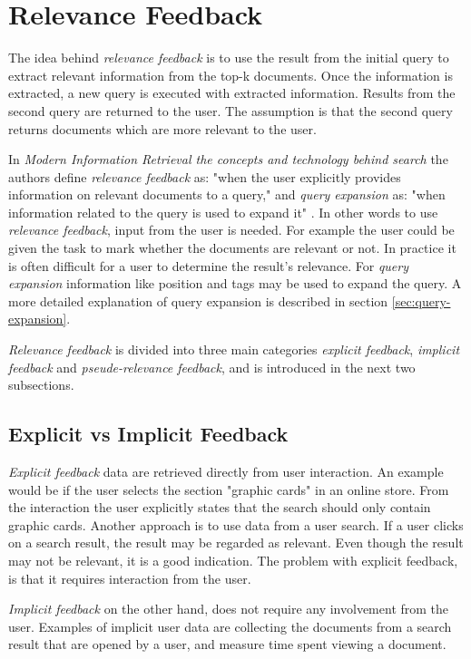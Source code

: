 \section{Relevance Feedback}
The idea behind \textit{relevance feedback} is to use the result from the initial query to extract relevant information from the top-k documents.
Once the information is extracted, a new query is executed with extracted information.
Results from the second query are returned to the user.
The assumption is that the second query returns documents which are more relevant to the user.

In \textit{Modern Information Retrieval the concepts and technology behind search} \cite{ir-book} the authors define \textit{relevance feedback} as: "when the user explicitly provides information on relevant documents to a query,"
and \textit{query expansion} as: "when information related to the query is used to expand it" \cite[p. 177]{ir-book}.
In other words to use \textit{relevance feedback}, input from the user is needed.
For example the user could be given the task to mark whether the documents are relevant or not.
In practice it is often difficult for a user to determine the result's relevance.
For \textit{query expansion} information like position and tags may be used to expand the query.
A more detailed explanation of query expansion is described in section \ref{sec:query-expansion}.

\textit{Relevance feedback} is divided into three main categories \textit{explicit feedback}, \textit{implicit feedback} and \textit{pseude-relevance feedback},
and is introduced in the next two subsections.

\subsection{Explicit vs Implicit Feedback}
\textit{Explicit feedback} data are retrieved directly from user interaction.
An example would be if the user selects the section "graphic cards" in an online store.
From the interaction the user explicitly states that the search should only contain graphic cards.
Another approach is to use data from a user search.
If a user clicks on a search result, the result may be regarded as relevant.
Even though the result may not be relevant, it is a good indication.
The problem with explicit feedback, is that it requires interaction from the user.

\textit{Implicit feedback} on the other hand, does not require any involvement from the user.
Examples of implicit user data are collecting the documents from a search result that  are opened by a user,
and measure time spent viewing a document.

